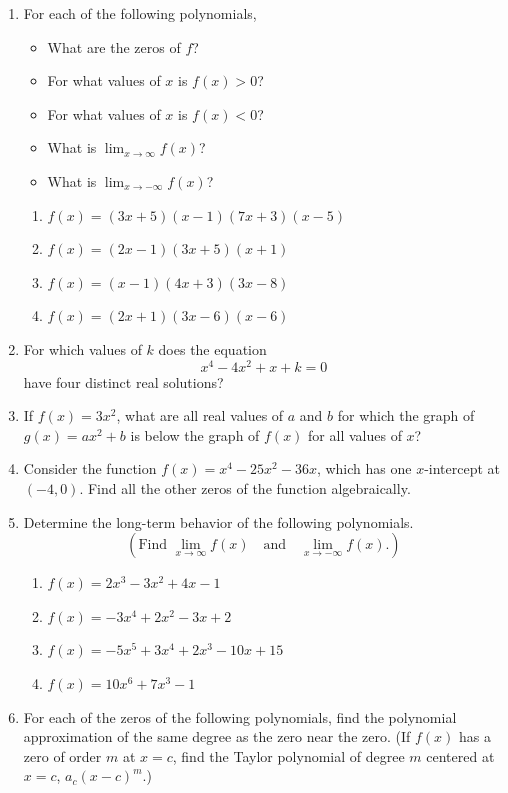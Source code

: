 \documentclass[
]{book}
\providecommand{\tightlist}{%
  \setlength{\itemsep}{0pt}\setlength{\parskip}{0pt}}
\theoremstyle{definition}
\theoremstyle{definition}
\theoremstyle{definition}
\theoremstyle{definition}
\theoremstyle{remark}
\begin{document}
\begin{enumerate}
\def\labelenumi{\arabic{enumi}.}
\item
  For each of the following polynomials,

  \begin{itemize}
  \tightlist
  \item
    What are the zeros of \(f\)?
  \item
    For what values of \(x\) is \(f(x)>0\)?
  \item
    For what values of \(x\) is \(f(x)<0\)?
  \item
    What is \({\displaystyle \lim_{x\rightarrow \infty} f(x)}\)?
  \item
    What is \({\displaystyle \lim_{x\rightarrow -\infty} f(x)}\)?
  \end{itemize}

  \begin{enumerate}
  \def\labelenumii{\alph{enumii}.}
  \tightlist
  \item
    \({\displaystyle f(x)=(3x+5)(x-1)(7x+3)(x-5)}\)
  \item
    \({\displaystyle f(x)=(2x-1)(3x+5)(x+1)}\)
  \item
    \({\displaystyle f(x)=(x-1)(4x+3)(3x-8)}\)
  \item
    \({\displaystyle f(x)=(2x+1)(3x-6)(x-6)}\)
  \end{enumerate}
\item
  For which values of \(k\) does the equation \[x^4-4x^2+x+k=0\] have four distinct real solutions?
\item
  If \(f(x)=3x^2\), what are all real values of \(a\) and \(b\) for which the graph of \(g(x)=ax^2+b\) is below the graph of \(f(x)\) for all values of \(x\)?
\item
  Consider the function \(f(x)=x^4-25x^2-36x\), which has one \(x\)-intercept at \((-4,0)\). Find all the other zeros of the function algebraically.
\item
  Determine the long-term behavior of the following polynomials.
  \[\left(\mbox{Find } \lim_{x\rightarrow \infty} f(x) \quad \mbox{and} \quad \lim_{x\rightarrow -\infty} f(x). \right)\]

  \begin{enumerate}
  \def\labelenumii{\alph{enumii}.}
  \tightlist
  \item
    \({\displaystyle f(x)=2x^3-3x^2+4x-1}\)
  \item
    \({\displaystyle f(x)=-3x^4+2x^2-3x+2}\)
  \item
    \({\displaystyle f(x)=-5x^5+3x^4+2x^3-10x+15}\)
  \item
    \({\displaystyle f(x)=10x^6+7x^3-1}\)
  \end{enumerate}
\item
  For each of the zeros of the following polynomials, find the polynomial approximation of the same degree as the zero near the zero. (If \(f(x)\) has a zero of order \(m\) at \(x=c\), find the Taylor polynomial of degree \(m\) centered at \(x=c\), \(a_c (x-c)^m\).)


\end{enumerate}
\end{document}
